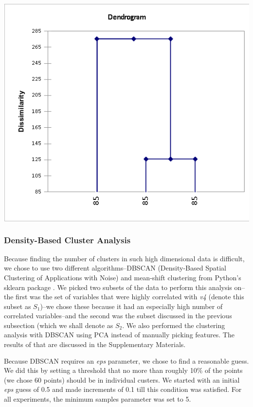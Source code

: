 \documentclass[smallextended]{svjour3}
\begin{document}
	\includegraphics[scale=0.35]{dendogram.png}
	\begingroup
	\endgroup
	\hfill\break
	
	\subsubsection{Density-Based Cluster Analysis}
	Because finding the number of clusters in such high dimensional data is difficult, we chose to use two different algorithms--DBSCAN (Density-Based Spatial Clustering of Applications with Noise)\cite{ester1996density} and mean-shift clustering \cite{comaniciu2002mean} from Python's sklearn package \cite{scikit-learn}. We picked two subsets of the data to perform this analysis on--the first was the set of variables that were highly correlated with \textit{v4} (denote this subset as $S_1$)--we chose these because it had an especially high number of correlated variables--and the second was the subset discussed in the previous subsection (which we shall denote as $S_2$. We also performed the clustering analysis with DBSCAN using PCA instead of manually picking features. The results of that are discussed in the Supplementary Materials.
	
	Because DBSCAN requires an \textit{eps} parameter, we chose to find a reasonable guess. We did this by setting a threshold that no more than roughly 10\% of the points (we chose 60 points) should be in individual custers. We started with an initial \textit{eps} guess of 0.5 and made increments of 0.1 till this condition was satisfied. For all experiments, the minimum samples parameter was set to 5.
	
\end{document}
